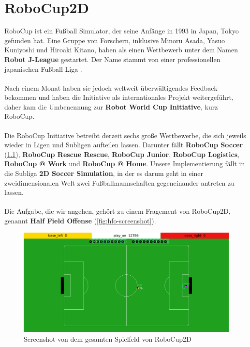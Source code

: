 \chapter{RoboCup2D}
    RoboCup ist ein Fußball Simulator, der seine Anfänge in 1993 in Japan, Tokyo gefunden hat. Eine Gruppe von Forschern, inklusive Minoru Asada, Yasuo Kuniyoshi und Hiroaki Kitano, haben als einen Wettbewerb unter dem Namen \textbf{Robot J-League} gestartet. Der Name stammt von einer professionellen japanischen Fußball Liga \cite{hfo-history}.\\
    \\
    Nach einem Monat haben sie jedoch weltweit überwältigendes Feedback bekommen und haben die Initiative als internationales Projekt weitergeführt, daher kam die Umbenennung zur \textbf{Robot World Cup Initiative}, kurz RoboCup. \\
    \\
    Die RoboCup Initiative betreibt derzeit sechs große Wettbewerbe, die sich jeweils wieder in Ligen und Subligen aufteilen lassen. Darunter fällt \textbf{RoboCup Soccer} (\ref{fig:robocup-screenshot}), \textbf{RoboCup Rescue Rescue}, \textbf{RoboCup Junior}, \textbf{RoboCup Logistics}, \textbf{RoboCup @ Work} und \textbf{RoboCup @ Home}. Unsere Implementierung fällt in die Subliga \textbf{2D Soccer Simulation}, in der es darum geht in einer zweidimensionalen Welt zwei Fußballmannschaften gegeneinander antreten zu lassen.\\
    \\
    Die Aufgabe, die wir angehen, gehört zu einem Fragement von RoboCup2D, genannt \textbf{Half Field Offense} (\ref{fig:hfo-screenshot}).\\
    \begin{figure}[htbp]
        \includegraphics[width = 1.0\textwidth, center]{../pictures/full-field.png}
        \caption{Screenshot von dem gesamten Spielfeld von RoboCup2D \label{fig:robocup-screenshot}}
    \end{figure}

